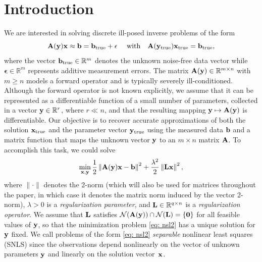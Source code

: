 \documentclass[onefignum,onetabnum]{siamart171218}
\newcommand{\bA}{{\bf A}}
\newcommand{\bL}{{\bf L}}
\newcommand{\bb}{{\bf b}}
\newcommand{\bx}{{\bf x}}
\newcommand{\by}{{\bf y}}
\begin{document}
\section{Introduction} We are interested in solving discrete ill-posed inverse problems of the %
form 
\begin{equation*}
\bA(\by)\bx  \approx \bb =  \bb_{\rm true} + \mathbf{\epsilon} \quad \mbox{ with\quad } \bA( \by_{\rm true}) \bx_{\rm true} = \bb_{\rm true},
\end{equation*}
where %
the vector $\bb_{\rm true} \in \mathbb{R}^m$ denotes the unknown noise-free data vector while $\mathbf{\epsilon} \in \mathbb{R}^m$ represents additive measurement errors. The matrix $\bA(\by) \in \mathbb{R}^{m\times n}$ with $m\geq n$ models a forward operator and is typically severely ill-conditioned. Although the forward operator is not known explicitly, we assume that it can be represented as a differentiable function of a small number of parameters, collected in a vector $\by \in \mathbb{R}^r$, where $r \ll n$, and that the resulting mapping $\by \mapsto \bA(\by)$ is differentiable. Our objective is to recover accurate approximations of both the solution $\bx_{\rm true}$ and the parameter vector $\by_{\rm true}$ using the measured data $\bb$ and a matrix function that maps the unknown vector $\by$ to an $m \times n$ matrix $\bA$. To accomplish this task, we could solve
\begin{equation}\label{eq: nsl2}
\min_{\bx, \by} \frac{1}{2}\left\|\bA(\by)\bx - \bb \right\|^2 + \frac{\lambda^2}{2} \left\|\bL \bx\right\|^2,
\end{equation}
where $\|\cdot\|$ denotes the 2-norm (which will also be used for matrices throughout the paper, in which case it denotes the matrix norm induced by the vector 2-norm), $\lambda>0$ is a \emph{regularization parameter}, and $\bL \in \mathbb{R}^{q\times n}$ is a \emph{regularization operator}. We assume that $\bL$ satisfies $\mathcal{N}(\bA(\by)) \cap \mathcal{N} (\bL) = \{\boldsymbol{0}\}$ for all feasible values of $\by$, so that the minimization problem \eqref{eq: nsl2} has a unique solution for $\by$ fixed. We call %
problems of %
the form \eqref{eq: nsl2}  \emph{separable} nonlinear least squares (SNLS) since the observations depend nonlinearly on the vector of unknown parameters $\by$ and linearly on the solution vector~$\bx$. 
\end{document}
